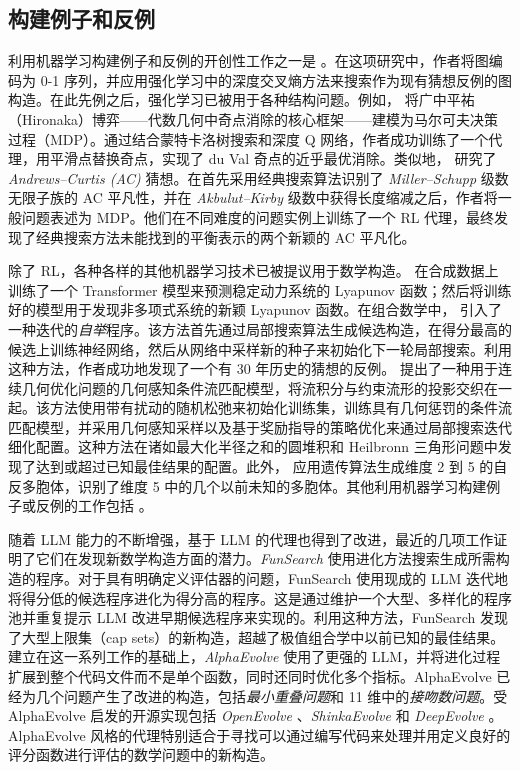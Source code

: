 \documentclass[11pt]{article}
\numberwithin{equation}{section}
\begin{document}
\subsection{构建例子和反例}

利用机器学习构建例子和反例的开创性工作之一是 \cite{wagner2021constructions}。在这项研究中，作者将图编码为 0-1 序列，并应用强化学习中的深度交叉熵方法来搜索作为现有猜想反例的图构造。在此先例之后，强化学习已被用于各种结构问题。例如，\cite{berczi2023ml} 将广中平祐（Hironaka）博弈——代数几何中奇点消除的核心框架——建模为马尔可夫决策过程（MDP）。通过结合蒙特卡洛树搜索和深度 Q 网络，作者成功训练了一个代理，用平滑点替换奇点，实现了 du Val 奇点的近乎最优消除。类似地，\cite{shehper2025what} 研究了 \textit{Andrews--Curtis (AC)} 猜想。在首先采用经典搜索算法识别了 \textit{Miller--Schupp} 级数无限子族的 AC 平凡性，并在 \textit{Akbulut--Kirby} 级数中获得长度缩减之后，作者将一般问题表述为 MDP。他们在不同难度的问题实例上训练了一个 RL 代理，最终发现了经典搜索方法未能找到的平衡表示的两个新颖的 AC 平凡化。

除了 RL，各种各样的其他机器学习技术已被提议用于数学构造。\cite{alfarano2024global} 在合成数据上训练了一个 Transformer 模型来预测稳定动力系统的 Lyapunov 函数；然后将训练好的模型用于发现非多项式系统的新颖 Lyapunov 函数。在组合数学中，\cite{charton2024patternboost} 引入了一种迭代的\textit{自举}程序。该方法首先通过局部搜索算法生成候选构造，在得分最高的候选上训练神经网络，然后从网络中采样新的种子来初始化下一轮局部搜索。利用这种方法，作者成功地发现了一个有 30 年历史的猜想的反例。\cite{bérczi2026flowbasedextremalmathematicalstructure} 提出了一种用于连续几何优化问题的几何感知条件流匹配模型，将流积分与约束流形的投影交织在一起。该方法使用带有扰动的随机松弛来初始化训练集，训练具有几何惩罚的条件流匹配模型，并采用几何感知采样以及基于奖励指导的策略优化来通过局部搜索迭代细化配置。这种方法在诸如最大化半径之和的圆堆积和 Heilbronn 三角形问题中发现了达到或超过已知最佳结果的配置。此外，\cite{BERGLUND2024138504} 应用遗传算法生成维度 2 到 5 的自反多胞体，识别了维度 5 中的几个以前未知的多胞体。其他利用机器学习构建例子或反例的工作包括 \cite{chervov2025cayleypy, chervov2025machine, Gukov_2025,swirszcz2025advancing,douglas2025diffusion}。

随着 LLM 能力的不断增强，基于 LLM 的代理也得到了改进，最近的几项工作证明了它们在发现新数学构造方面的潜力。\textit{FunSearch} \cite{romera2024mathematical} 使用进化方法搜索生成所需构造的程序。对于具有明确定义评估器的问题，FunSearch 使用现成的 LLM 迭代地将得分低的候选程序进化为得分高的程序。这是通过维护一个大型、多样化的程序池并重复提示 LLM 改进早期候选程序来实现的。利用这种方法，FunSearch 发现了大型上限集（cap sets）的新构造，超越了极值组合学中以前已知的最佳结果。建立在这一系列工作的基础上，\textit{AlphaEvolve} \cite{novikov2025alphaevolve} 使用了更强的 LLM，并将进化过程扩展到整个代码文件而不是单个函数，同时还同时优化多个指标。AlphaEvolve 已经为几个问题产生了改进的构造，包括\textit{最小重叠问题}和 11 维中的\textit{接吻数问题}。受 AlphaEvolve 启发的开源实现包括 \textit{OpenEvolve} \cite{openevolve}、\textit{ShinkaEvolve} \cite{lange2025shinkaevolve} 和 \textit{DeepEvolve} \cite{liu2025scientific}。AlphaEvolve 风格的代理特别适合于寻找可以通过编写代码来处理并用定义良好的评分函数进行评估的数学问题中的新构造。
\end{document}

